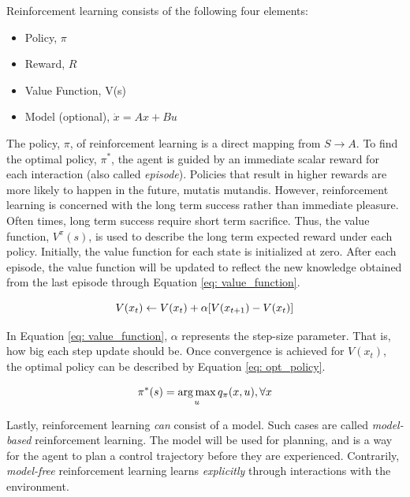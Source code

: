 Reinforcement learning consists of the following four elements:

\begin{itemize}
    \item Policy, $\pi$
    \item Reward, $R$
    \item Value Function, V(s)
    \item Model (optional), $\dot{x} = Ax + Bu$
\end{itemize}

The policy, $\pi$, of reinforcement learning is a direct mapping from $S \rightarrow A$.  To find the optimal policy, $\pi^*$, the agent is guided by an immediate scalar reward for each interaction (also called \textit{episode}). Policies that result in higher rewards are more likely to happen in the future, mutatis mutandis.  However, reinforcement learning is concerned with the long term success rather than immediate pleasure. Often times, long term success require short term sacrifice.  Thus, the value function, $V^{\pi}(s)$, is used to describe the long term expected reward under each policy.  Initially, the value function for each state is initialized at zero.  After each episode, the value function will be updated to reflect the new knowledge obtained from the last episode through Equation \ref{eq: value_function}.

\begin{equation}
    \centering
    V(x_t) \leftarrow V(x_t) + \alpha [V(x_{t + 1}) - V(x_t)]
    \label{eq: value_function}
\end{equation}

In Equation \ref{eq: value_function}, $\alpha$ represents the step-size parameter.  That is, how big each step update should be.  Once convergence is achieved for $V(x_t)$, the optimal policy can be described by Equation \ref{eq: opt_policy}.  

\begin{equation}
    \centering
    \pi^*(s) = \argmax_u q_{\pi}(x, u), \forall x 
    \label{eq: opt_policy}
\end{equation}

Lastly, reinforcement learning \textit{can} consist of a model. Such cases are called \textit{model-based} reinforcement learning.  The model will be used for planning, and is a way for the agent to plan a control trajectory before they are experienced.  Contrarily, \textit{model-free} reinforcement learning learns \textit{explicitly} through interactions with the environment.

